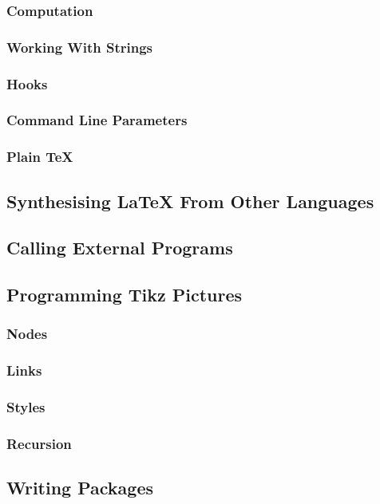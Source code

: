 \subsubsection{Computation}
\subsubsection{Working With Strings}
\subsubsection{Hooks}
\subsubsection{Command Line Parameters}
\subsubsection{Plain \TeX}\label{section:programming/advancedFeatures/plainTeX}


\subsection{Synthesising \LaTeX{} From Other Languages}


\subsection{Calling External Programs}


\subsection{Programming Tikz Pictures}
\subsubsection{Nodes}
\subsubsection{Links}
\subsubsection{Styles}
\subsubsection{Recursion}


\subsection{Writing Packages}


